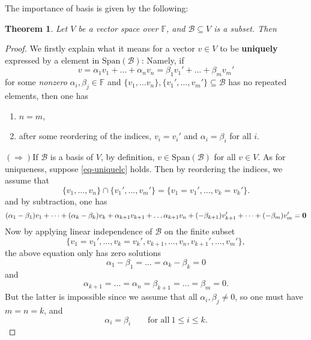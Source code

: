 \documentclass[11pt,openany]{book}
\theoremstyle{plain}
\newtheorem{theorem}{Theorem}[chapter]
\theoremstyle{definition}
\theoremstyle{remark}
\begin{document}
The importance of basis is given by the following:
\begin{theorem} \label{thm-uniquesum}
    Let $V$ be a vector space over $\mathbb{F}$, and $\mathcal{B} \subseteq V$ is a subset. Then 
    \begin{center}
    \end{center}
\end{theorem}
\begin{proof}
    We firstly explain what it means for a vector $v \in V$ to be {\bf uniquely} expressed by a element in $\mathrm{Span}(\mathcal{B})$: Namely, if 
    \begin{equation} \label{eq-uniquelc}
    v = \alpha_1v_1 + \dots + \alpha_nv_n = \beta_1v_1' + \dots + \beta_mv_m' \tag{*}
    \end{equation}
    for some {\it nonzero} $\alpha_i, \beta_j \in \mathbb{F}$ and $\{v_1, \dots v_n\}, \{v_1', \dots, v_m'\} \subseteq \mathcal{B}$ has no repeated elements, then one has 
    \begin{enumerate}
        \item $n = m$,
        \item after some reordering of the indices, $v_i = v_i'$ and $\alpha_i = \beta_i$ for all $i$.
    \end{enumerate}
    

    \noindent $(\Rightarrow) $If $\mathcal{B}$ is a basis of $V$, by definition, $v \in\mathrm{Span}(\mathcal{B})$ for all $v \in V$. As for uniqueness, suppose \eqref{eq-uniquelc} holds. Then by reordering the indices, we assume that
    $$\{v_1,\dots, v_n\} \cap \{v_1', \dots, v_m'\} = \{v_1 = v_1', \dots, v_k = v_k'\}.$$
    and by subtraction, one has
    $$(\alpha_1 - \beta_1)v_1 + \dots + (\alpha_k - \beta_k) v_k + \alpha_{k+1} v_{k+1} + \dots \alpha_{k+1} v_{n} + (-\beta_{k+1})v_{k+1}' + \dots + (-\beta_{m}) v_{m}' = {\bf 0}$$
    Now by applying linear independence of $\mathcal{B}$ on the finite subset
    $$\{v_1 = v_1', \dots, v_k = v_k', v_{k+1}, \dots, v_n, v_{k+1}', \dots, v_m'\},$$
    the above equation only has zero solutions
    $$\alpha_1 - \beta_1 = \dots = \alpha_k - \beta_k = 0$$
    and
    $$\alpha_{k+1} = \dots =\alpha_n = \beta_{k+1} = \dots = \beta_m = 0.$$ But the latter is impossible since we assume that all $\alpha_i, \beta_j \neq 0$, so one must have $m = n = k$, and 
    $$\alpha_i = \beta_i \quad \quad \text{for all}\ 1 \leq i \leq k.$$


\end{proof}
\end{document}
